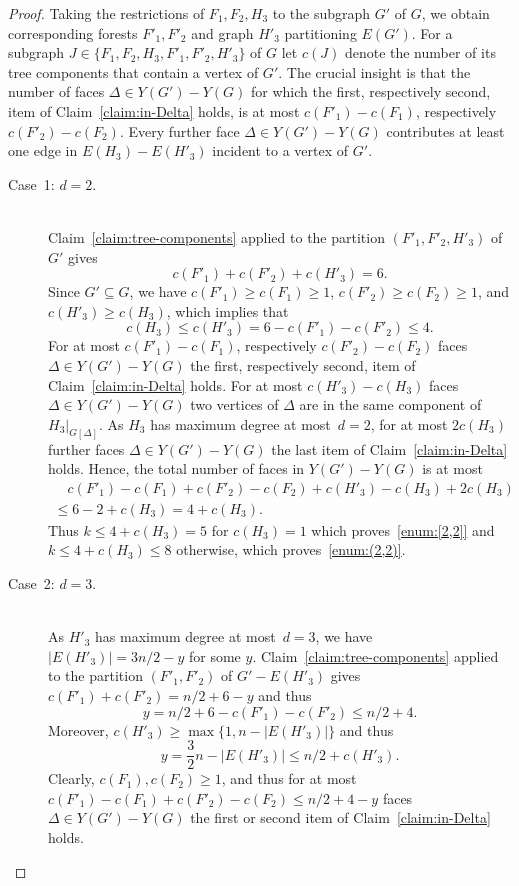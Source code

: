 \documentclass[a4paper,10pt]{article}
\theoremstyle{plain}
\begin{document}
\begin{proof}
 \medskip

 Taking the restrictions of $F_1,F_2,H_3$ to the subgraph $G'$ of $G$, we obtain corresponding forests $F'_1,F'_2$ and graph $H'_3$ partitioning $E(G')$.
 For a subgraph $J \in \{F_1,F_2,H_3,F'_1,F'_2,H'_3\}$ of $G$ let $c(J)$ denote the number of its tree components that contain a vertex of $G'$.
 The crucial insight is that the number of faces $\Delta \in Y(G')-Y(G)$ for which the first, respectively second, item of Claim~\ref{claim:in-Delta} holds, is at most $c(F'_1)-c(F_1)$, respectively $c(F'_2)-c(F_2)$.
 Every further face $\Delta \in Y(G')-Y(G)$ contributes at least one edge in $E(H_3) - E(H'_3)$ incident to a vertex of $G'$.
  
 \begin{description}
  \item[Case~1: $d=2$.]{\ \\}
   Claim~\ref{claim:tree-components} applied to the partition $(F'_1,F'_2,H'_3)$ of $G'$ gives
   \[
    c(F'_1) + c(F'_2) + c(H'_3) = 6.
   \]
   Since $G' \subseteq G$, we have $c(F'_1) \geq c(F_1) \geq 1$, $c(F'_2) \geq c(F_2) \geq 1$, and $c(H'_3) \geq c(H_3)$, which implies that 
   \[
    c(H_3) \leq c(H'_3) = 6 - c(F'_1) - c(F'_2) \leq 4.
   \]
   For at most $c(F'_1)- c(F_1)$, respectively $c(F'_2) - c(F_2)$ faces $\Delta \in Y(G')-Y(G)$ the first, respectively second, item of Claim~\ref{claim:in-Delta} holds.
   For at most $c(H'_3) - c(H_3)$ faces $\Delta \in Y(G')-Y(G)$ two vertices of $\Delta$ are in the same component of $H_3|_{G[\Delta]}$.
   As $H_3$ has maximum degree at most~$d=2$, for at most $2c(H_3)$ further faces $\Delta \in Y(G')-Y(G)$ the last item of Claim~\ref{claim:in-Delta} holds.
   Hence, the total number of faces in $Y(G') - Y(G)$ is at most 
   \begin{eqnarray*}
    \quad c(F'_1) - c(F_1) + c(F'_2) - c(F_2) + c(H'_3) - c(H_3) + 2c(H_3) \hspace{4em} \\
     \leq 6 - 2 + c(H_3) = 4 + c(H_3).
   \end{eqnarray*}
   Thus $k \leq 4+c(H_3) = 5$ for $c(H_3)=1$ which proves~\ref{enum:[2,2]} and $k \leq 4+c(H_3) \leq 8$ otherwise, which proves~\ref{enum:(2,2)}.
   
  \item[Case~2: $d=3$.]{\ \\}
   As $H'_3$ has maximum degree at most~$d=3$, we have $|E(H'_3)| = 3n/2 - y$ for some $y$. 
   Claim~\ref{claim:tree-components} applied to the partition $(F'_1,F'_2)$ of $G' - E(H'_3)$ gives $c(F'_1) + c(F'_2) = n/2 + 6 - y$ and thus
   \[
    y = n/2 + 6 - c(F'_1) - c(F'_2) \leq n/2 + 4.
   \]
   Moreover, $c(H'_3) \geq \max\{1,n-|E(H'_3)|\}$ and thus
   \[
    y = \frac{3}{2}n - |E(H'_3)| \leq n/2 + c(H'_3).
   \]
   Clearly, $c(F_1), c(F_2) \geq 1$, and thus for at most $c(F'_1)- c(F_1) + c(F'_2) - c(F_2) \leq n/2 + 4 - y$ faces $\Delta \in Y(G')-Y(G)$ the first or second item of Claim~\ref{claim:in-Delta} holds.
   

\end{description}
\end{proof}
\end{document}
